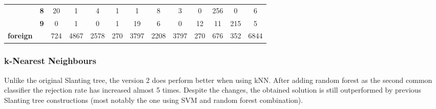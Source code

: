 \begin{table}[htp]
{\begin{tabular}{|c|c|c|c|c|c|c|c|c|c|c|c|c|}
		& \textbf{8} & 20         & 1          & 4          & 1          & 1          & 8          & 3          & 0          & 256        & 0          & 6                \\ \cline{2-13} 
		& \textbf{9} & 0          & 1          & 0          & 1          & 19         & 6          & 0          & 12         & 11         & 215        & 5                \\ \hline
		\textbf{foreign}                    & \textbf{}  & 724        & 4867       & 2578       & 270        & 3797       & 2208       & 3797       & 270        & 676        & 352        & 6844             \\ \hline
	\end{tabular}
}
\end{table}

\subsubsection{k-Nearest Neighbours}

Unlike the original Slanting tree, the version 2 does perform better when using kNN. After adding random forest as the second common classifier the rejection rate has increased almost 5 times. Despite the changes, the obtained solution is still outperformed by previous Slanting tree constructions (most notably the one using SVM and random forest combination). 

